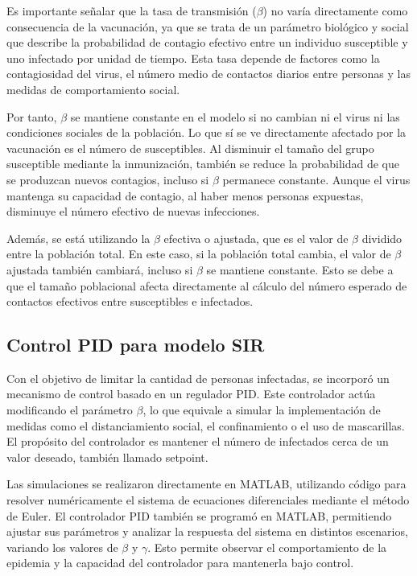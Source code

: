 Es importante señalar que la tasa de transmisión ($\beta$) no varía directamente como consecuencia de la vacunación, ya que se trata de un parámetro biológico y social que describe la probabilidad de contagio efectivo entre un individuo susceptible y uno infectado por unidad de tiempo. Esta tasa depende de factores como la contagiosidad del virus, el número medio de contactos diarios entre personas y las medidas de comportamiento social.

Por tanto, $\beta$ se mantiene constante en el modelo si no cambian ni el virus ni las condiciones sociales de la población. Lo que sí se ve directamente afectado por la vacunación es el número de susceptibles. Al disminuir el tamaño del grupo susceptible mediante la inmunización, también se reduce la probabilidad de que se produzcan nuevos contagios, incluso si $\beta$ permanece constante. Aunque el virus mantenga su capacidad de contagio, al haber menos personas expuestas, disminuye el número efectivo de nuevas infecciones.

Además, se está utilizando la $\beta$ efectiva o ajustada, que es el valor de $\beta$ dividido entre la población total. En este caso, si la población total cambia, el valor de $\beta$ ajustada también cambiará, incluso si $\beta$ se mantiene constante. Esto se debe a que el tamaño poblacional afecta directamente al cálculo del número esperado de contactos efectivos entre susceptibles e infectados.

\subsection{Control PID para modelo SIR}
Con el objetivo de limitar la cantidad de personas infectadas, se incorporó un mecanismo de control basado en un regulador PID. Este controlador actúa modificando el parámetro $\beta$, lo que equivale a simular la implementación de medidas como el distanciamiento social, el confinamiento o el uso de mascarillas. El propósito del controlador es mantener el número de infectados cerca de un valor deseado, también llamado setpoint.

Las simulaciones se realizaron directamente en MATLAB, utilizando código para resolver numéricamente el sistema de ecuaciones diferenciales mediante el método de Euler. El controlador PID también se programó en MATLAB, permitiendo ajustar sus parámetros y analizar la respuesta del sistema en distintos escenarios, variando los valores de $\beta$ y $\gamma$. Esto permite observar el comportamiento de la epidemia y la capacidad del controlador para mantenerla bajo control.

